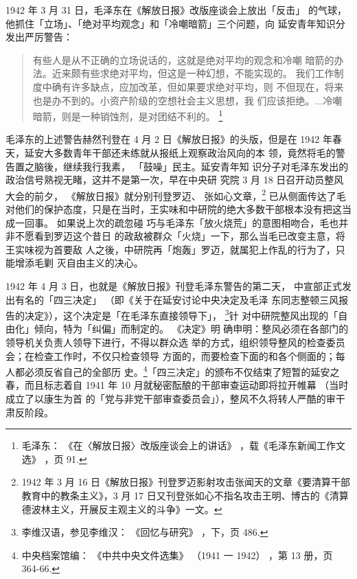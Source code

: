1942 年 3 月 31 日，毛泽东在《解放日报》改版座谈会上放出「反击」
的气球，他抓住「立场」、「绝对平均观念」和「冷嘲暗箭」三个问题，向
延安青年知识分发出严厉警告：
\begin{quote}
{\fzwkai 有些人是从不正确的立场说话的，这就是绝对平均的观念和冷嘲
暗箭的办法。近来颇有些求绝对平均，但这是一种幻想，不能实现的。
我们工作制度中确有许多缺点，应加改革，但如果要求绝对平均，则
不但现在，将来也是办不到的。小资产阶级的空想社会主义思想，我
们应该拒绝。...冷嘲暗箭，则是一种销蚀剂，是对团结不利的。
\footnote{毛泽东：
《在〈解放日报〉改版座谈会上的讲话》
，载《毛泽东新闻工作文选》
，页 91. 
} 
}
\end{quote}
毛泽东的上述警告赫然刊登在 4 月 2 日《解放日报》的头版，但是在
1942 年春天，延安大多数青年干部还未练就从报纸上观察政治风向的本
领，竟然将毛的警告置之脑後，继续我行我素，
「鼓噪」民主。延安青年知
识分子对毛泽东发出的政治信号熟视无睹，这并不是第一次，早在中央研
究院 3 月 18 日召开动员整风大会的前夕，
《解放日报》就分别刊登罗迈、
张如心文章，\footnote{ 1942 年 3 月 16 日《解放日报》刊登罗迈影射攻击张闻天的文章《要清算干部教育中的教条主义》，3 月 17 日又刊登张如心不指名攻击王明、博古的《清算德波林主义，开展反主观主义的斗争》一文。
}
已从侧面传达了毛对他们的保护态度，只是在当时，王实味和中研院的绝大多数干部根本没有把这当成一回事。
如果说上次的疏忽碰
巧与毛泽东「放火烧荒」的意图相吻合，毛也并非不愿看到罗迈这个昔日
的政敌被群众「火烧」一下，那么当毛已改变主意，将王实味视为首要敌
人之後，中研院再「炮轰」罗迈，就属犯上作乱的行为了，只能增添毛剿
灭自由主义的决心。

1942 年 4 月 3 日，也就是《解放日报》刊登毛泽东警告的第二天，
中宣部正式发出有名的「四三决定」
（即《关于在延安讨论中央决定及毛泽
东同志整顿三风报告的决定》），这个决定是「在毛泽东直接领导下」，
\footnote{李维汉语，参见李维汉：
《回忆与研究》
，下，页 486.}针
对中研院整风出现的「自由化」倾向，特为「纠偏」而制定的。
《决定》明
确申明：整风必须在各部门的领导机关负责人领导下进行，不得以群众选
举的方式，组织领导整风的检查委员会；在检查工作时，不仅只检查领导
方面的，而要检查下面的和各个侧面的；每人都必须反省自己的全部历
史。\footnote{中央档案馆编：
《中共中央文件选集》
（1941 一 1942）
，第 13 册，页 364-66.}「四三决定」的颁布不仅结束了短暂的延安之春，而且标志着自 1941
年 10 月就秘密酝酿的干部审查运动即将拉开帷幕
（当时成立了以康生为首
的「党与非党干部审查委员会」），整风不久将转人严酷的审干肃反阶段。


